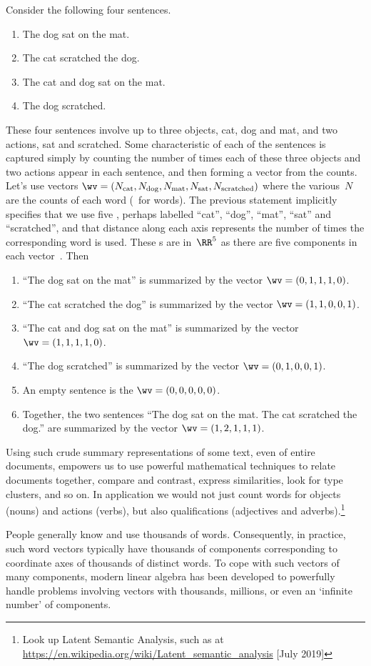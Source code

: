 \begin{example} \label{eg:deflsv}
Consider the following four sentences.
\begin{enumerate}
\item The dog sat on the mat.
\item The cat scratched the dog.
\item The cat and dog sat on the mat.
\item The dog scratched.
\end{enumerate}
These four sentences involve up to three objects, cat, dog and mat, and two actions, sat and scratched.  
Some characteristic of each of the sentences is captured simply by counting the number of times each of these three objects and two actions appear in each sentence, and then forming a vector from the counts.
Let's use vectors \(\sloppy\wv=(N_{\text{cat}}, N_{\text{dog}}, N_{\text{mat}}, N_{\text{sat}}, N_{\text{scratched}})\) where the various~\(N\) are the counts of each word (\wv~for words). 
The previous statement implicitly specifies that we use five , perhaps labelled ``cat'', ``dog'', ``mat'', ``sat'' and ``scratched'', and that distance along each axis represents the number of times the corresponding word is used.
These s are in~\(\RR^5\) as there are five components in each vector~\wv.
Then
\begin{enumerate}
\item ``The dog sat on the mat'' is summarized by the vector \(\wv=(0,1,1,1,0)\).
\item ``The cat scratched the dog'' is summarized by the vector \(\wv=(1,1,0,0,1)\).
\item ``The cat and dog sat on the mat'' is summarized by the vector \(\wv=(1,1,1,1,0)\).
\item ``The dog scratched'' is summarized by the vector \(\wv=(0,1,0,0,1)\).
\item An empty sentence is the  \(\wv=(0,0,0,0,0)\).
\item Together, the two sentences ``The dog sat on the mat.
 The cat scratched the dog.'' are summarized by the vector \(\wv=(1,2,1,1,1)\).
\end{enumerate}
Using such crude summary representations of some text, even of entire documents, empowers us to use powerful mathematical techniques to relate documents together, compare and contrast, express similarities, look for type clusters, and so on.
In application we would not just count words for objects (nouns) and actions (verbs), but also qualifications (adjectives and adverbs).\footnote{Look up Latent Semantic Analysis, such as at \url{https://en.wikipedia.org/wiki/Latent_semantic_analysis} [July 2019]}

People generally know and use thousands of words.
Consequently, in practice, such word vectors typically have thousands of components corresponding to coordinate axes of thousands of distinct words.
To cope with such vectors of many components, modern linear algebra has been developed to powerfully handle problems involving vectors with thousands, millions, or even an `infinite number' of components.
\end{example}

